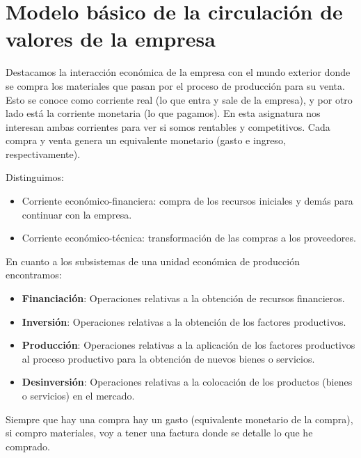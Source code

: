 \documentclass[12pt]{report} %
\providecommand{\tightlist}{%
  \setlength{\itemsep}{0pt}\setlength{\parskip}{0pt}}
\begin{document}
\hypertarget{modelo-buxe1sico-de-la-circulaciuxf3n-de-valores-de-la-empresa}{%
\section{Modelo básico de la circulación de valores de la
empresa}\label{modelo-buxe1sico-de-la-circulaciuxf3n-de-valores-de-la-empresa}}

Destacamos la interacción económica de la empresa con el mundo exterior
donde se compra los materiales que pasan por el proceso de producción
para su venta. Esto se conoce como corriente real (lo que entra y sale
de la empresa), y por otro lado está la corriente monetaria (lo que
pagamos). En esta asignatura nos interesan ambas corrientes para ver si
somos rentables y competitivos. Cada compra y venta genera un
equivalente monetario (gasto e ingreso, respectivamente).

Distinguimos:

\begin{itemize}
\tightlist
\item
  Corriente económico-financiera: compra de los recursos iniciales y
  demás para continuar con la empresa.
\item
  Corriente económico-técnica: transformación de las compras a los
  proveedores.
\end{itemize}

En cuanto a los subsistemas de una unidad económica de producción
encontramos:

\begin{itemize}
\tightlist
\item
  \textbf{Financiación}: Operaciones relativas a la obtención de
  recursos financieros.
\item
  \textbf{Inversión}: Operaciones relativas a la obtención de los
  factores productivos.
\item
  \textbf{Producción}: Operaciones relativas a la aplicación de los
  factores productivos al proceso productivo para la obtención de nuevos
  bienes o servicios.
\item
  \textbf{Desinversión}: Operaciones relativas a la colocación de los
  productos (bienes o servicios) en el mercado.
\end{itemize}


Siempre que hay una compra hay un gasto (equivalente monetario de la
compra), si compro materiales, voy a tener una factura donde se detalle
lo que he comprado.
\end{document}
